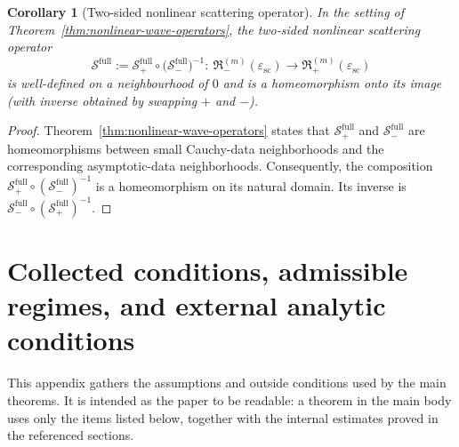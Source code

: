 \documentclass[11pt]{article}
\numberwithin{equation}{section}
\theoremstyle{plain}
\newtheorem{corollary}[theorem]{Corollary}
\theoremstyle{definition}
\theoremstyle{remark}
\begin{document}
\begin{corollary}[Two-sided nonlinear scattering operator]\label{cor:scattering-operator}
In the setting of Theorem~\ref{thm:nonlinear-wave-operators}, the two-sided nonlinear scattering operator
\begin{equation}
\mathscr S^{\mathrm{full}}
:=\mathscr S_{+}^{\mathrm{full}}\circ\bigl(\mathscr S_{-}^{\mathrm{full}}\bigr)^{-1}
:\ \mathfrak R_{-}^{(m)}(\varepsilon_{\mathrm{sc}})\longrightarrow \mathfrak R_{+}^{(m)}(\varepsilon_{\mathrm{sc}})
\end{equation}
is well-defined on a neighbourhood of $0$ and is a homeomorphism onto its image (with inverse obtained by swapping $+$ and $-$).
\end{corollary}

\begin{proof}
Theorem~\ref{thm:nonlinear-wave-operators} states that $\mathscr S^{\mathrm{full}}_+$ and $\mathscr S^{\mathrm{full}}_-$ are homeomorphisms between small Cauchy-data neighborhoods and the corresponding asymptotic-data neighborhoods.  Consequently, the composition $\mathscr S^{\mathrm{full}}_+\circ(\mathscr S^{\mathrm{full}}_-)^{-1}$ is a homeomorphism on its natural domain.  Its inverse is $\mathscr S^{\mathrm{full}}_-\circ(\mathscr S^{\mathrm{full}}_+)^{-1}$.
\end{proof}






\appendix






\section{Collected conditions, admissible regimes, and external analytic conditions}\label{app:standing-conditions}

This appendix gathers the assumptions and outside conditions used by the main theorems.  It is intended as the paper to be readable: a theorem in the main body uses only the items listed below, together with the internal estimates proved in the referenced sections.  
\end{document}
